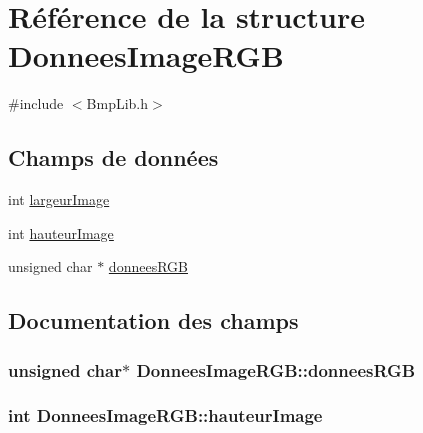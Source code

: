 \hypertarget{struct_donnees_image_r_g_b}{}\section{Référence de la structure Donnees\+Image\+R\+GB}
\label{struct_donnees_image_r_g_b}


{\ttfamily \#include $<$Bmp\+Lib.\+h$>$}

\subsection*{Champs de données}
\begin{DoxyCompactItemize}
\item 
int \hyperlink{struct_donnees_image_r_g_b_a371e9e6a48ebd26478d635b18b8cbce0}{largeur\+Image}
\item 
int \hyperlink{struct_donnees_image_r_g_b_acd30657c28c5afb357a4268771feed53}{hauteur\+Image}
\item 
unsigned char $\ast$ \hyperlink{struct_donnees_image_r_g_b_a10941ee0696f9b8b564f93cc5603cae1}{donnees\+R\+GB}
\end{DoxyCompactItemize}


\subsection{Documentation des champs}
\subsubsection[{\texorpdfstring{donnees\+R\+GB}{donneesRGB}}]{\setlength{\rightskip}{0pt plus 5cm}unsigned char$\ast$ Donnees\+Image\+R\+G\+B\+::donnees\+R\+GB}\hypertarget{struct_donnees_image_r_g_b_a10941ee0696f9b8b564f93cc5603cae1}{}\label{struct_donnees_image_r_g_b_a10941ee0696f9b8b564f93cc5603cae1}
\subsubsection[{\texorpdfstring{hauteur\+Image}{hauteurImage}}]{\setlength{\rightskip}{0pt plus 5cm}int Donnees\+Image\+R\+G\+B\+::hauteur\+Image}\hypertarget{struct_donnees_image_r_g_b_acd30657c28c5afb357a4268771feed53}{}\label{struct_donnees_image_r_g_b_acd30657c28c5afb357a4268771feed53}
